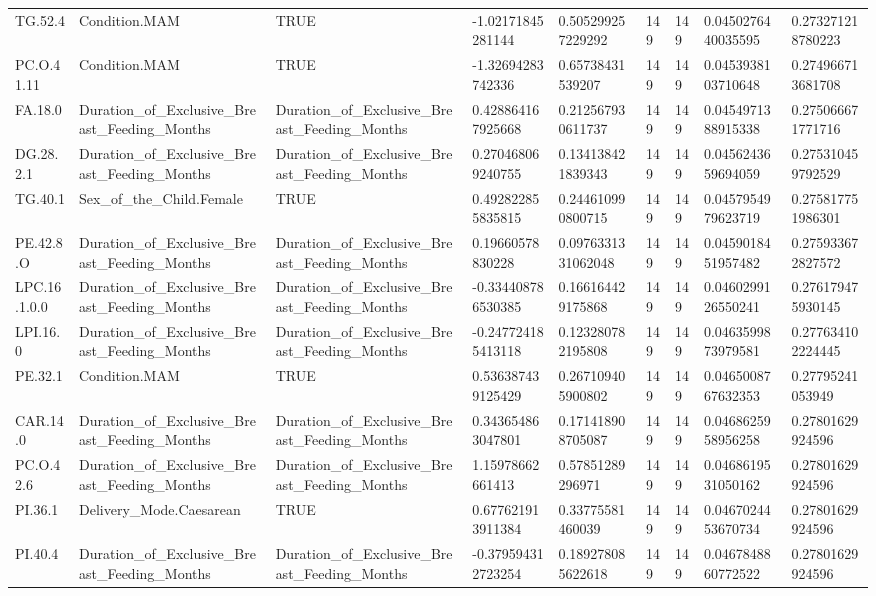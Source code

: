 \begin{longtable}{lllllllll}
TG.52.4 & Condition.MAM & TRUE & -1.02171845281144 & 0.505299257229292 & 149 & 149 & 0.0450276440035595 & 0.273271218780223 \\
PC.O.41.11 & Condition.MAM & TRUE & -1.32694283742336 & 0.65738431539207 & 149 & 149 & 0.0453938103710648 & 0.274966713681708 \\
FA.18.0 & Duration\_of\_Exclusive\_Breast\_Feeding\_Months & Duration\_of\_Exclusive\_Breast\_Feeding\_Months & 0.428864167925668 & 0.212567930611737 & 149 & 149 & 0.0454971388915338 & 0.275066671771716 \\
DG.28.2.1 & Duration\_of\_Exclusive\_Breast\_Feeding\_Months & Duration\_of\_Exclusive\_Breast\_Feeding\_Months & 0.270468069240755 & 0.134138421839343 & 149 & 149 & 0.0456243659694059 & 0.275310459792529 \\
TG.40.1 & Sex\_of\_the\_Child.Female & TRUE & 0.492822855835815 & 0.244610990800715 & 149 & 149 & 0.0457954979623719 & 0.275817751986301 \\
PE.42.8.O & Duration\_of\_Exclusive\_Breast\_Feeding\_Months & Duration\_of\_Exclusive\_Breast\_Feeding\_Months & 0.19660578830228 & 0.0976331331062048 & 149 & 149 & 0.0459018451957482 & 0.275933672827572 \\
LPC.16.1.0.0 & Duration\_of\_Exclusive\_Breast\_Feeding\_Months & Duration\_of\_Exclusive\_Breast\_Feeding\_Months & -0.334408786530385 & 0.166164429175868 & 149 & 149 & 0.0460299126550241 & 0.276179475930145 \\
LPI.16.0 & Duration\_of\_Exclusive\_Breast\_Feeding\_Months & Duration\_of\_Exclusive\_Breast\_Feeding\_Months & -0.247724185413118 & 0.123280782195808 & 149 & 149 & 0.0463599873979581 & 0.277634102224445 \\
PE.32.1 & Condition.MAM & TRUE & 0.536387439125429 & 0.267109405900802 & 149 & 149 & 0.0465008767632353 & 0.27795241053949 \\
CAR.14.0 & Duration\_of\_Exclusive\_Breast\_Feeding\_Months & Duration\_of\_Exclusive\_Breast\_Feeding\_Months & 0.343654863047801 & 0.171418908705087 & 149 & 149 & 0.0468625958956258 & 0.27801629924596 \\
PC.O.42.6 & Duration\_of\_Exclusive\_Breast\_Feeding\_Months & Duration\_of\_Exclusive\_Breast\_Feeding\_Months & 1.15978662661413 & 0.57851289296971 & 149 & 149 & 0.0468619531050162 & 0.27801629924596 \\
PI.36.1 & Delivery\_Mode.Caesarean & TRUE & 0.677621913911384 & 0.33775581460039 & 149 & 149 & 0.0467024453670734 & 0.27801629924596 \\
PI.40.4 & Duration\_of\_Exclusive\_Breast\_Feeding\_Months & Duration\_of\_Exclusive\_Breast\_Feeding\_Months & -0.379594312723254 & 0.189278085622618 & 149 & 149 & 0.0467848860772522 & 0.27801629924596 \\

\end{longtable}
